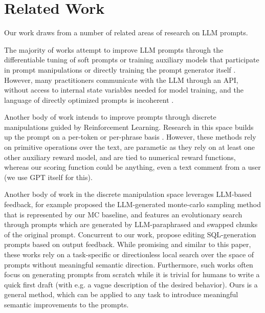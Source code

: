 \section{Related Work}
Our work draws from a number of related areas of research on LLM prompts. 

The majority of works attempt to improve LLM prompts through the differentiable tuning of soft prompts \cite{lester2021power,qin2021learning} or training auxiliary models that participate in prompt manipulations \cite{hao2022optimizing,deng2022rlprompt,zhou2022large} or directly training the prompt generator itself \cite{hao2022optimizing,wang2022self}. However, many practitioners communicate with the LLM through an API, without access to internal state variables needed for model training, and the language of directly optimized prompts is incoherent \cite{hambardzumyan2021warp}. 

Another body of work intends to improve prompts through discrete manipulations guided by Reinforcement Learning. Research in this space builds up the prompt on a per-token \cite{shin2020autoprompt} or per-phrase basis \cite{zhang2023tempera,deng2022rlprompt}. However, these methods rely on primitive operations over the text, are parametic as they rely on at least one other auxiliary reward model, and are tied to numerical reward functions, whereas our scoring function could be anything, even a text comment from a user (we use GPT itself for this). 

Another body of work in the discrete manipulation space leverages LLM-based feedback, for example \citet{zhou2022large,guo2023learning} proposed the LLM-generated monte-carlo sampling method that is represented by our MC baseline, and \citet{prasad2022grips} features an evolutionary search through prompts which are generated by LLM-paraphrased and swapped chunks of the original prompt. Concurrent to our work, \citet{chen2023teaching} propose editing SQL-generation prompts based on output feedback. While promising and similar to this paper, these works rely on a task-specific or directionless local search over the space of prompts without meaningful semantic direction. Furthermore, such works often focus on generating prompts from scratch \cite{honovich2022instruction} while it is trivial for humans to write a quick first draft (with e.g. a vague description of the desired behavior). Ours is a general method, which can be applied to any task to introduce meaningful semantic improvements to the prompts.

    


